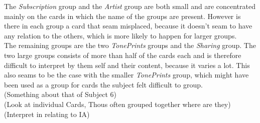 The \textit{Subscription} group and the \textit{Artist} group are both small and are concentrated mainly on the cards in which the name of the groups are present. However is there in each group a card that seam misplaced, because it doesn't seam to have any relation to the others, which is more likely to happen for larger groups.\\
The remaining groups are the two \textit{TonePrints} groups and the \textit{Sharing} group. The two large groups consists of more than half of the cards each and is therefore difficult to interpret by them self and their content, because it varies a lot. This also seams to be the case with the smaller \textit{TonePrints} group, which might have been used as a group for cards the subject felt difficult to group. \\
(Something about that of Subject 6)\\
(Look at individual Cards, Thous often grouped together where are they)\\
(Interpret in relating to IA)














